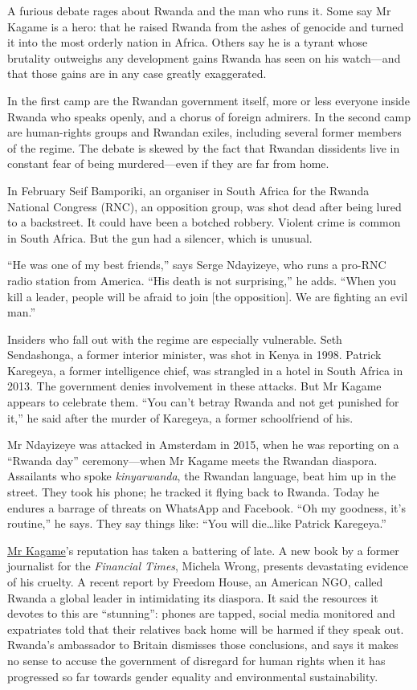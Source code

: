 \documentclass{article}
\begin{document}
A furious debate rages about Rwanda and the man who runs it. Some say Mr Kagame is a hero: that he raised Rwanda from the ashes of genocide and turned it into the most orderly nation in Africa. Others say he is a tyrant whose brutality outweighs any development gains Rwanda has seen on his watch---and that those gains are in any case greatly exaggerated. 

In the first camp are the Rwandan government itself, more or less everyone inside Rwanda who speaks openly, and a chorus of foreign admirers. In the second camp are human-rights groups and Rwandan exiles, including several former members of the regime. The debate is skewed by the fact that Rwandan dissidents live in constant fear of being murdered---even if they are far from home. 

In February Seif Bamporiki, an organiser in South Africa for the Rwanda National Congress (RNC), an opposition group, was shot dead after being lured to a backstreet. It could have been a botched robbery. Violent crime is common in South Africa. But the gun had a silencer, which is unusual. 

``He was one of my best friends,'' says Serge Ndayizeye, who runs a pro-RNC radio station from America. ``His death is not surprising,'' he adds. ``When you kill a leader, people will be afraid to join {[}the opposition{]}. We are fighting an evil man.'' 

Insiders who fall out with the regime are especially vulnerable. Seth Sendashonga, a former interior minister, was shot in Kenya in 1998. Patrick Karegeya, a former intelligence chief, was strangled in a hotel in South Africa in 2013. The government denies involvement in these attacks. But Mr Kagame appears to celebrate them. ``You can't betray Rwanda and not get punished for it,'' he said after the murder of Karegeya, a former schoolfriend of his. 

Mr Ndayizeye was attacked in Amsterdam in 2015, when he was reporting on a ``Rwanda day'' ceremony---when Mr Kagame meets the Rwandan diaspora. Assailants who spoke \emph{kinyarwanda}, the Rwandan language, beat him up in the street. They took his phone; he tracked it flying back to Rwanda. Today he endures a barrage of threats on WhatsApp and Facebook. ``Oh my goodness, it's routine,'' he says. They say things like: ``You will die\ldots{}like Patrick Karegeya.'' 

\href{/node/21799666}{Mr Kagame}'s reputation has taken a battering of late. A new book by a former journalist for the \emph{Financial Times}, Michela Wrong, presents devastating evidence of his cruelty. A recent report by Freedom House, an American NGO, called Rwanda a global leader in intimidating its diaspora. It said the resources it devotes to this are ``stunning'': phones are tapped, social media monitored and expatriates told that their relatives back home will be harmed if they speak out. Rwanda's ambassador to Britain dismisses those conclusions, and says it makes no sense to accuse the government of disregard for human rights when it has progressed so far towards gender equality and environmental sustainability. 
\end{document}
